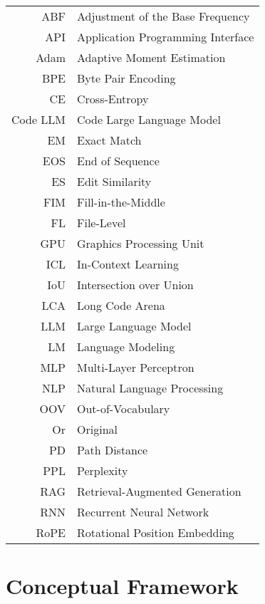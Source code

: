 \documentclass[english,bachelor,unicode,oneside]{ctufit-thesis}
\begin{document}
\begin{tabular}{rl}
  ABF & Adjustment of the Base Frequency\\
  API & Application Programming Interface\\
  Adam & Adaptive Moment Estimation\\
  BPE & Byte Pair Encoding\\
  CE & Cross-Entropy\\
  Code LLM & Code Large Language Model\\
  EM & Exact Match\\
  EOS & End of Sequence\\
  ES & Edit Similarity\\
  FIM & Fill-in-the-Middle\\
  FL & File-Level\\
  GPU & Graphics Processing Unit\\
  ICL & In-Context Learning\\
  IoU & Intersection over Union\\
  LCA & Long Code Arena\\
  LLM & Large Language Model\\
  LM & Language Modeling\\
  MLP & Multi-Layer Perceptron\\
  NLP & Natural Language Processing\\
  OOV & Out-of-Vocabulary\\
  Or & Original\\
  PD & Path Distance\\
  PPL & Perplexity\\
  RAG & Retrieval-Augmented Generation\\
  RNN & Recurrent Neural Network\\
  RoPE & Rotational Position Embedding\\
\end{tabular}

\resumeTOCentries
\mainmatter\mainmatterinit



\part{Conceptual Framework}\label{part:conceptual-framework}  %




\end{document}
